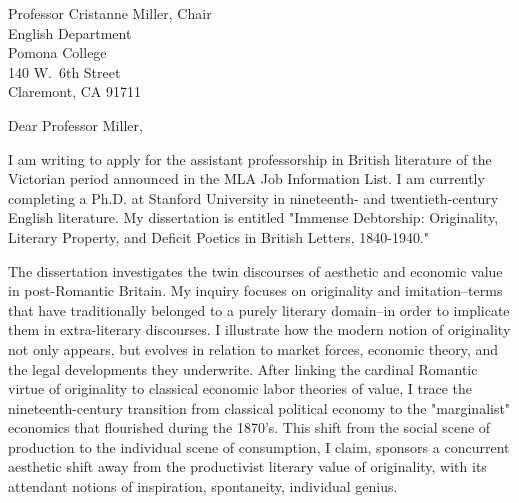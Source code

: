 \documentclass[11pt,draft]{mtletter}
\begin{document}
\begin{letter}{%
Professor Cristanne Miller, Chair \\
English Department \\
Pomona College \\
140 W.~6th Street \\
Claremont, CA 91711
}
 

\opening{Dear Professor Miller,}
 
I am writing to apply for the assistant professorship in British literature of the Victorian period announced in the MLA Job Information List. I am currently completing a Ph.D. at Stanford University in nineteenth- and twentieth-century English literature. My dissertation is entitled "Immense Debtorship: Originality, Literary Property, and Deficit Poetics in British Letters, 1840-1940."

The dissertation investigates the twin discourses of aesthetic and economic value in post-Romantic Britain. My inquiry focuses on originality and imitation--terms that have traditionally belonged to a purely literary domain--in order to implicate them in extra-literary discourses. I illustrate how the modern notion of originality not only appears, but evolves in relation to market forces, economic theory, and the legal developments they underwrite. After linking the cardinal Romantic virtue of originality to classical economic labor theories of value, I trace the nineteenth-century transition from classical political economy to the "marginalist" economics that flourished during the 1870's. This shift from the social scene of production to the individual scene of consumption, I claim, sponsors a concurrent aesthetic shift away from the productivist literary value of originality, with its attendant notions of inspiration, spontaneity, individual genius.


\end{letter}
\end{document}

